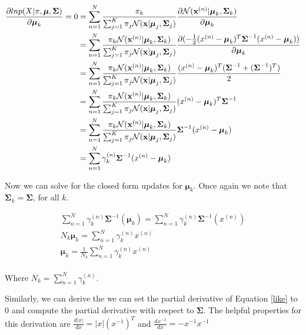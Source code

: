 \documentclass[12pt]{article}
\newcommand{\bmu}{{\boldsymbol{\mu}}}
\newcommand{\bSigma}{{\boldsymbol{\Sigma}}}
\newcommand{\bx}{{\bf{x}}}
\begin{document}
\begin{equation}\label{dermu}
\begin{split}
\frac{\partial ln p(X|\pi,\bmu,\bSigma)}{\partial \bmu_k} = 0 &= \sum_{n=1}^N 
\frac{\pi_k}{\sum_{j=1}^K \pi_j {\cal{N}}(\bx | \bmu_j, \bSigma_j)}
\frac{\partial {\cal{N}}(\bx^{(n)} | \bmu_k, \bSigma_k)}{\partial \bmu_k} \\
&=\sum_{n=1}^N \frac{\pi_k {\cal{N}}(\bx^{(n)} | \bmu_k, \bSigma_k)}{\sum_{j=1}^K \pi_j {\cal{N}}(\bx | \bmu_j, \bSigma_j)} \frac{\partial (-\frac{1}{2}(x^{(n)}-\bmu_k)^T\bSigma^{-1}(x^{(n)}-\bmu_k))}{\partial \bmu_k} \\
&=\sum_{n=1}^N \frac{\pi_k {\cal{N}}(\bx^{(n)} | \bmu_k, \bSigma_k)}{\sum_{j=1}^K \pi_j {\cal{N}}(\bx | \bmu_j, \bSigma_j)} \frac{(x^{(n)}-\bmu_k)^T(\bSigma^{-1}+(\bSigma^{-1})^T)}{2} \\
&=\sum_{n=1}^N \frac{\pi_k {\cal{N}}(\bx^{(n)} | \bmu_k, \bSigma_k)}{\sum_{j=1}^K \pi_j {\cal{N}}(\bx | \bmu_j, \bSigma_j)} (x^{(n)}-\bmu_k)^T\bSigma^{-1} \\
&=\sum_{n=1}^N \frac{\pi_k {\cal{N}}(\bx^{(n)} | \bmu_k, \bSigma_k)}{\sum_{j=1}^K \pi_j {\cal{N}}(\bx | \bmu_j, \bSigma_j)} \bSigma^{-1}(x^{(n)}-\bmu_k) \\
&=\sum_{n=1}^N \gamma_k^{(n)} \bSigma^{-1}(x^{(n)}-\bmu_k) \\
\end{split}
\end{equation}

Now we can solve for the closed form updates for $\bmu_k$. Once again we note that $\bSigma_k = \bSigma$, for all $k$.

\begin{equation}\label{dermu}
\begin{split}
\sum_{n=1}^N \gamma_k^{(n)} \bSigma^{-1}(\bmu_k) = \sum_{n=1}^N \gamma_k^{(n)} \bSigma^{-1}(x^{(n)}) \\ 
N_k\bmu_k = \sum_{n=1}^N \gamma_k^{(n)}x^{(n)} \\
\bmu_k = \frac{1}{N_k}\sum_{n=1}^N \gamma_k^{(n)}x^{(n)} \\ 
\end{split}
\end{equation}

Where $N_k=\sum_{n=1}^N \gamma_k^{(n)}$.

Similarly, we can derive the we can set the partial derivative of Equation \ref{like} to 0 and compute the partial derivative with respect to $\bSigma$. The helpful properties for this derivation are $\frac{d|x|}{dx}=|x|(x^{-1})^T$ and $\frac{dx^{-1}}{dx}=-x^{-1}x^{-1}$
\end{document}
